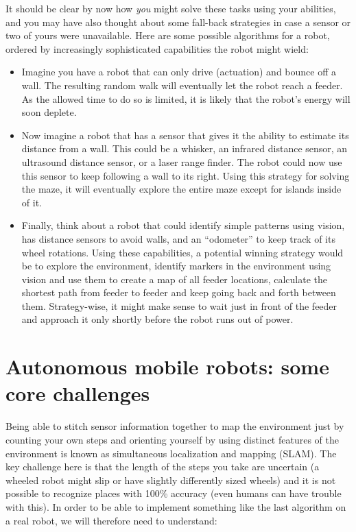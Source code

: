 It should be clear by now how \textsl{you} might solve these tasks using your abilities, and you may have also thought about some fall-back strategies in case a sensor or two of yours were unavailable. Here are some possible algorithms for a robot, ordered by increasingly sophisticated capabilities the robot might wield:
\begin{itemize}
\item Imagine you have a robot that can only drive (actuation) and bounce off a wall. The resulting random walk will eventually let the robot reach a feeder. As the allowed time to do so is limited, it is likely that the robot's energy will soon deplete.
\item Now imagine a robot that has a sensor that gives it the ability to estimate its distance from a wall. This could be a whisker, an infrared distance sensor, an ultrasound distance sensor, or a laser range finder. The robot could now use this sensor to keep following a wall to its right. Using this strategy for solving the maze, it will eventually explore the entire maze except for islands inside of it.
\item Finally, think about a robot that could identify simple patterns using vision, has distance sensors to avoid walls, and an ``odometer'' to keep track of its wheel rotations. Using these capabilities, a potential winning strategy would be to explore the environment, identify markers in the environment using vision and use them to create a map of all feeder locations, calculate the shortest path from feeder to feeder and keep going back and forth between them. Strategy-wise, it might make sense to wait just in front of the feeder and approach it only shortly before the robot runs out of power.
\end{itemize}

\section{Autonomous mobile robots: some core challenges}

Being able to stitch sensor information together to map the environment just by counting your own steps and orienting yourself by using distinct features of the environment is known as simultaneous localization and mapping (SLAM). The key challenge here is that the length of the steps you take are uncertain (a wheeled robot might slip or have slightly differently sized wheels) and it is not possible to recognize places with 100\% accuracy (even humans can have trouble with this). In order to be able to implement something like the last algorithm on a real robot, we will therefore need to understand:

